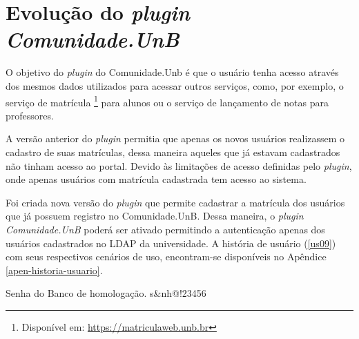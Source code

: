 
\section{Evolução do \textit{plugin Comunidade.UnB}}
\label{plugin-comunidade}

O objetivo do \textit{plugin} do Comunidade.Unb é que o usuário tenha acesso através dos mesmos dados utilizados para acessar outros serviços, como, por exemplo, o serviço de matrícula \footnote{Disponível em: \url{https://matriculaweb.unb.br}} para alunos ou o serviço de lançamento de notas para professores.

A versão anterior do \textit{plugin} permitia que apenas os novos usuários realizassem o cadastro de suas matrículas, dessa maneira aqueles que já estavam cadastrados não tinham acesso ao portal. Devido às limitações de acesso definidas pelo \textit{plugin}, onde apenas usuários com matrícula cadastrada tem acesso ao sistema.

Foi criada nova versão do \textit{plugin} que permite cadastrar a matrícula dos usuários que já possuem registro no Comunidade.UnB. Dessa maneira, o \textit{plugin Comunidade.UnB} poderá ser ativado permitindo a autenticação apenas dos usuários cadastrados no LDAP da universidade. A história de usuário (\ref{us09}) com seus respectivos cenários de uso, encontram-se disponíveis no Apêndice \ref{apen-historia-usuario}.

Senha do Banco de homologação.
s&nh@!23456